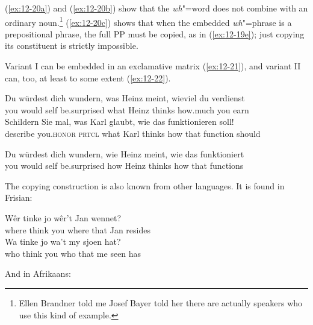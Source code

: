 \documentclass[output=paper]{langsci/langscibook}
\begin{document}
(\ref{ex:12-20a}) and (\ref{ex:12-20b}) show that the \emph{wh}"=word does not combine with an
ordinary noun.\footnote{%
	Ellen Brandner told me Josef Bayer told her
  there are actually speakers who use this kind of example.%
} (\ref{ex:12-20c})
shows that when the embedded \emph{wh}"=phrase is a prepositional
phrase, the full PP must be copied, as in (\ref{ex:12-19e}); just copying its
 constituent is strictly impossible.

Variant I can be embedded in an exclamative matrix (\ref{ex:12-21}), and variant
II can, too, at least to some extent (\ref{ex:12-22}).
\begin{exe}
\ex
\label{ex:12-21}
\begin{xlist}
\ex
\label{ex:12-21a}
\gll
Du würdest dich wundern, was Heinz meint, wieviel du verdienst \\
you would self be.surprised what Heinz thinks how.much you earn \\
\ex
\label{ex:12-21b}
\gll
Schildern Sie mal, was Karl glaubt, wie das funktionieren soll! \\
describe you.\textsc{honor} \textsc{prtcl} what Karl thinks how that function should \\
\end{xlist}       
\ex
\label{ex:12-22}
\gll
Du würdest dich wundern, wie Heinz meint, wie das funktioniert \\
you would self be.surprised how Heinz thinks how that functions \\
\end{exe}
The copying construction is also known from other languages. It is found in
Frisian:
\begin{exe}
\ex
\label{ex:12-23}
\begin{xlist}
\ex
\label{ex:12-23a}
\gll
W\^er tinke jo w\^er't Jan wennet? \\
where think you {where that} Jan resides \\
\ex
\label{ex:12-23b}
\gll
Wa tinke jo wa't my sjoen hat? \\
who think you {who that} me seen has \\
\end{xlist}
\end{exe}
And in Afrikaans:
\end{document}
